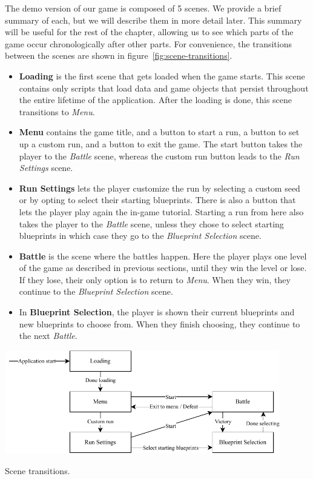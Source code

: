 The demo version of our game is composed of 5 scenes.
We provide a brief summary of each, but we will describe them in more detail later.
This summary will be useful for the rest of the chapter, allowing us to see which parts of the game occur chronologically after other parts.
For convenience, the transitions between the scenes are shown in figure~\ref{fig:scene-transitions}.
\begin{itemize}
    \item \textbf{Loading} is the first scene that gets loaded when the game starts.
          This scene contains only scripts that load data and game objects that persist throughout the entire lifetime of the application.
          After the loading is done, this scene transitions to \emph{Menu}.
    \item \textbf{Menu} contains the game title, and a button to start a run, a button to set up a custom run, and a button to exit the game.
          The start button takes the player to the \emph{Battle} scene, whereas the custom run button leads to the \emph{Run Settings} scene.
    \item \textbf{Run Settings} lets the player customize the run by selecting a custom seed or by opting to select their starting blueprints.
          There is also a button that lets the player play again the in-game tutorial.
          Starting a run from here also takes the player to the \emph{Battle} scene, unless they chose to select starting blueprints in which case they go to the \emph{Blueprint Selection} scene.
    \item \textbf{Battle} is the scene where the battles happen.
          Here the player plays one level of the game as described in previous sections, until they win the level or lose.
          If they lose, their only option is to return to \emph{Menu}.
          When they win, they continue to the \emph{Blueprint Selection} scene.
    \item In \textbf{Blueprint Selection}, the player is shown their current blueprints and new blueprints to choose from.
          When they finish choosing, they continue to the next \emph{Battle}.
\end{itemize}


\begin{center}
    \captionsetup{type=figure}
    \includegraphics[width=0.9\textwidth]{img/Scene transitions.pdf}
    \caption{Scene transitions.}
    \label{fig:scene-transitions}
\end{center}


